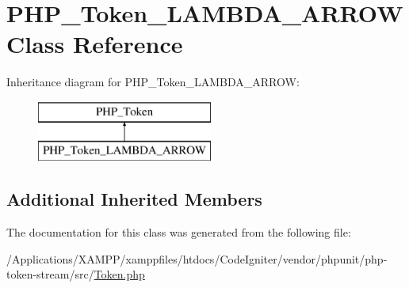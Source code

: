 \hypertarget{class_p_h_p___token___l_a_m_b_d_a___a_r_r_o_w}{}\section{P\+H\+P\+\_\+\+Token\+\_\+\+L\+A\+M\+B\+D\+A\+\_\+\+A\+R\+R\+OW Class Reference}
\label{class_p_h_p___token___l_a_m_b_d_a___a_r_r_o_w}
Inheritance diagram for P\+H\+P\+\_\+\+Token\+\_\+\+L\+A\+M\+B\+D\+A\+\_\+\+A\+R\+R\+OW\+:\begin{figure}[H]
\begin{center}
\leavevmode
\includegraphics[height=2.000000cm]{class_p_h_p___token___l_a_m_b_d_a___a_r_r_o_w}
\end{center}
\end{figure}
\subsection*{Additional Inherited Members}


The documentation for this class was generated from the following file\+:\begin{DoxyCompactItemize}
\item 
/\+Applications/\+X\+A\+M\+P\+P/xamppfiles/htdocs/\+Code\+Igniter/vendor/phpunit/php-\/token-\/stream/src/\mbox{\hyperlink{_token_8php}{Token.\+php}}\end{DoxyCompactItemize}
